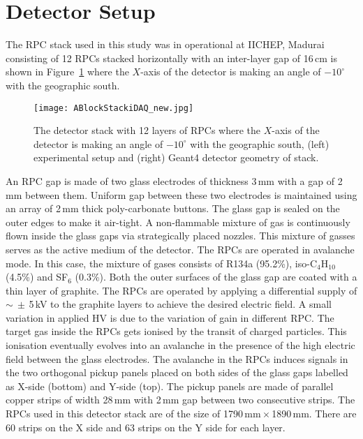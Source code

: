 \section{Detector Setup} \label{sec:detectorA}
The RPC stack used in this study was in operational at IICHEP, Madurai
  consisting of 12 RPCs
stacked horizontally with an inter-layer gap of 16\,cm is shown in
Figure~\ref{fig:stack} where the $X$-axis of the detector is making an
angle of $-10^\circ$ with the geographic south.
\begin{figure}[h]
  \centering
  \texttt{[image: ABlockStackiDAQ\_new.jpg]} 
  \caption{The detector stack with 12 layers of RPCs where the
    $X$-axis of the detector is making an angle of $-10^\circ$ with
    the geographic south, (left) experimental setup and (right) Geant4
    detector geometry of stack.}
  \label{fig:stack}
\end{figure}
An RPC gap is made of two glass electrodes of thickness 3\,mm with
a gap of 2\,mm between them. Uniform gap between these two electrodes
is maintained using an array of 2\,mm thick poly-carbonate buttons.
The glass gap is sealed on the outer edges to make it air-tight.
A non-flammable mixture of gas is continuously
flown inside the glass gaps via strategically placed nozzles.
This mixture of gasses serves as the active medium of the detector.
The RPCs are operated in avalanche mode. In this case, the mixture of
gases consists of R134a (95.2\%), iso-C$_4$H$_{10}$ (4.5\%) and
SF$_6$ (0.3\%). Both the outer surfaces of the glass gap are coated
with a thin layer of graphite. The RPCs are operated by applying
a differential supply of $\sim\:\pm$\,5\,kV to the graphite layers to
achieve the desired electric field. A small variation in applied HV is
  due to the variation of gain in different RPC. The target gas inside the RPCs gets
ionised by the transit of charged particles. This ionisation eventually
evolves into an avalanche in the presence of the high electric field
between the glass electrodes. The avalanche in the RPCs induces
signals in the two orthogonal pickup panels placed on both sides of
the glass gaps labelled as X-side (bottom) and Y-side (top). The pickup
panels are made of parallel copper strips of width 28\,mm with 2\,mm
gap between two consecutive strips. The RPCs used in this detector
stack are of the size of 1790\,mm\,$\times$\,1890\,mm. There are
60 strips on the X side and 63 strips on the Y side for each layer.

